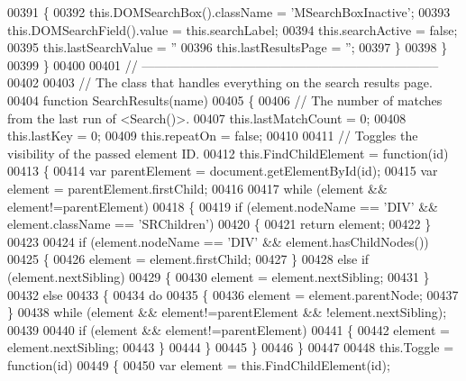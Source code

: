 \begin{DoxyCode}
00391     \{
00392       this.DOMSearchBox().className = \textcolor{stringliteral}{'MSearchBoxInactive'};
00393       this.DOMSearchField().value   = this.searchLabel;
00394       this.searchActive             = \textcolor{keyword}{false};
00395       this.lastSearchValue          = \textcolor{stringliteral}{''}
00396       this.lastResultsPage          = \textcolor{stringliteral}{''};
00397     \}
00398   \}
00399 \}
00400 
00401 \textcolor{comment}{// -----------------------------------------------------------------------}
00402 
00403 \textcolor{comment}{// The class that handles everything on the search results page.}
00404 \textcolor{keyword}{function} SearchResults(name)
00405 \{
00406     \textcolor{comment}{// The number of matches from the last run of <Search()>.}
00407     this.lastMatchCount = 0;
00408     this.lastKey = 0;
00409     this.repeatOn = \textcolor{keyword}{false};
00410 
00411     \textcolor{comment}{// Toggles the visibility of the passed element ID.}
00412     this.FindChildElement = \textcolor{keyword}{function}(id)
00413     \{
00414       var parentElement = document.getElementById(\textcolor{keywordtype}{id});
00415       var element = parentElement.firstChild;
00416 
00417       \textcolor{keywordflow}{while} (element && element!=parentElement)
00418       \{
00419         \textcolor{keywordflow}{if} (element.nodeName == \textcolor{stringliteral}{'DIV'} && element.className == \textcolor{stringliteral}{'SRChildren'})
00420         \{
00421           \textcolor{keywordflow}{return} element;
00422         \}
00423 
00424         \textcolor{keywordflow}{if} (element.nodeName == \textcolor{stringliteral}{'DIV'} && element.hasChildNodes())
00425         \{
00426            element = element.firstChild;
00427         \}
00428         \textcolor{keywordflow}{else} \textcolor{keywordflow}{if} (element.nextSibling)
00429         \{
00430            element = element.nextSibling;
00431         \}
00432         \textcolor{keywordflow}{else}
00433         \{
00434           \textcolor{keywordflow}{do}
00435           \{
00436             element = element.parentNode;
00437           \}
00438           \textcolor{keywordflow}{while} (element && element!=parentElement && !element.nextSibling);
00439 
00440           \textcolor{keywordflow}{if} (element && element!=parentElement)
00441           \{
00442             element = element.nextSibling;
00443           \}
00444         \}
00445       \}
00446     \}
00447 
00448     this.Toggle = \textcolor{keyword}{function}(id)
00449     \{
00450       var element = this.FindChildElement(\textcolor{keywordtype}{id});

\end{DoxyCode}
